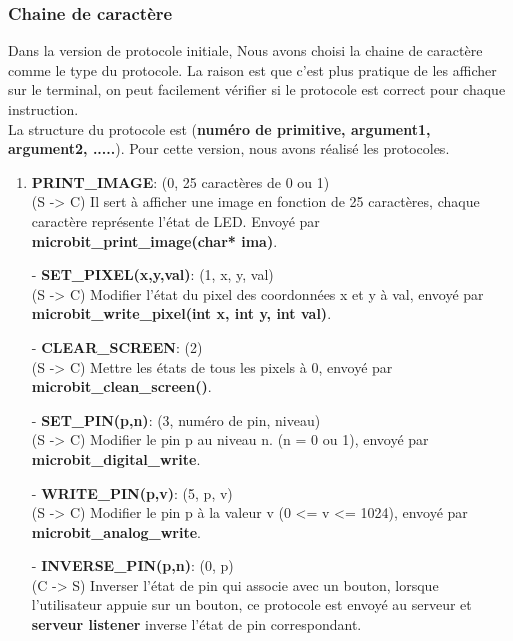 \documentclass[14px]{article}
\begin{document}
	\subsubsection{Chaine de caractère}
	Dans la version de protocole initiale, Nous avons choisi la chaine de caractère comme le type du protocole. La raison est que c'est plus pratique de les afficher sur le terminal, on peut facilement vérifier si le protocole est correct pour chaque instruction. \\
	La structure du protocole est (\textbf{numéro de primitive, argument1, argument2, .....}).
	Pour cette version, nous avons réalisé les protocoles.
	\begin{enumerate}
		\item \textbf{PRINT\_IMAGE}: (0, 25 caractères de 0 ou 1)\\
		(S -> C) Il sert à afficher une image en fonction de 25 caractères, chaque caractère représente l'état de LED. Envoyé par \textbf{microbit\_print\_image(char* ima)}.
		\item[-] \textbf{SET\_PIXEL(x,y,val)}: (1, x, y, val)\\
		(S -> C) Modifier l'état du pixel des coordonnées x et y à val, envoyé par \textbf{microbit\_write\_pixel(int x, int y, int val)}.
		\item[-] \textbf{CLEAR\_SCREEN}: (2)\\
		(S -> C) Mettre les états de tous les pixels à 0, envoyé par \textbf{microbit\_clean\_screen()}.
		\item[-] \textbf{SET\_PIN(p,n)}: (3, numéro de pin, niveau)\\
		(S -> C) Modifier le pin p au niveau n. (n = 0 ou 1), envoyé par \textbf{microbit\_digital\_write}.
		\item[-] \textbf{WRITE\_PIN(p,v)}: (5, p, v)\\
		(S -> C) Modifier le pin p à la valeur v (0 <= v <= 1024), envoyé par \textbf{microbit\_analog\_write}.\\

		\item[-] \textbf{INVERSE\_PIN(p,n)}: (0, p)\\
		(C -> S) Inverser l'état de pin qui associe avec un bouton, lorsque l'utilisateur appuie sur un bouton, ce protocole est envoyé au serveur et \textbf{serveur listener} inverse l'état de pin correspondant.
	\end{enumerate}
\end{document}
